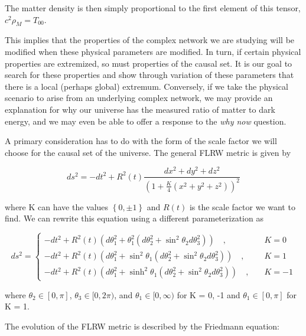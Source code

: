 \documentclass[preprint,notitlepage,amsmath,amssymb,floatfix]{revtex4-1}
\begin{document}
\noindent The matter density is then simply proportional to the first element of this tensor, $c^2\rho_M = T_{00}$. \par
This implies that the properties of the complex network we are studying will be modified when these physical parameters are modified.
In turn, if certain physical properties are extremized, so must properties of the causal set.
It is our goal to search for these properties and show through variation of these parameters that there is a local (perhaps global) extremum.
Conversely, if we take the physical scenario to arise from an underlying complex network, we may provide an explanation for why our universe has the measured ratio of matter to dark energy, and we may even be able to offer a response to the \textit{why now} question. \par
A primary consideration has to do with the form of the scale factor we will choose for the causal set of the universe.  The general FLRW metric is given by

\begin{equation}
ds^2 = -dt^2 + R^2\left(t\right)\frac{dx^2 + dy^2 + dz^2}{\left(1 + \frac{K}{4}\left(x^2+y^2+z^2\right)\right)^2}
\end{equation}

\noindent where K can have the values $\left\{0, \pm 1\right\}$ and $R\left(t\right)$ is the scale factor we want to find.  We can rewrite this equation using a different parameterization as

\begin{equation}\label{ds^2}
ds^2 = 
\begin{cases}
-dt^2 + R^2\left(t\right)\left(d\theta_1^2 + \theta_1^2\left(d\theta_2^2+\sin^2\theta_2 d\theta_3^2\right)\right)\quad, & \quad K = 0 \\
-dt^2 + R^2\left(t\right)\left(d\theta_1^2 + \sin^2\theta_1\left(d\theta_2^2 + \sin^2\theta_2 d\theta_3^2\right)\right)\quad, & \quad K = 1 \\
-dt^2 + R^2\left(t\right)\left(d\theta_1^2 + \sinh^2\theta_1\left(d\theta_2^2 + \sin^2\theta_2 d\theta_3^2\right)\right)\quad, & \quad K = -1
\end{cases}
\end{equation}

\noindent where $\theta_2\in[0,\pi]$, $\theta_3\in[0,2\pi)$, and $\theta_1\in[0,\infty)$ for K = 0, -1 and $\theta_1\in[0,\pi]$ for K = 1. \par
The evolution of the FLRW metric is described by the Friedmann equation:
\end{document}
